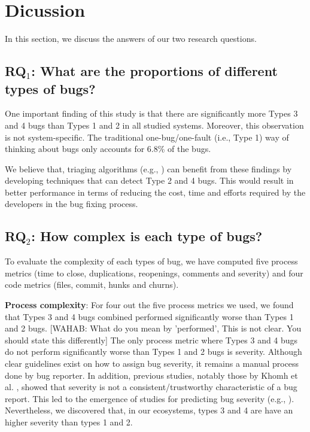 
\section{Dicussion}

In this section, we discuss the answers of our two research questions.

\subsection{RQ$_1$: What are the proportions of different types of
bugs?}


One important finding of this study is that there are significantly more Types 3 and 4 bugs than Types 1 and 2 in all studied systems.
Moreover, this observation is not system-specific.
The traditional one-bug/one-fault (i.e., Type 1) way of thinking about bugs only accounts for 6.8\% of the bugs.

We believe that, triaging algorithms (e.g., \cite{Jalbert2008,Jeong2009,Khomh2011a,Tamrawi2011a}) can benefit from these findings by developing techniques that can detect Type 2 and 4 bugs.
This would result in better performance in terms of reducing the cost, time and efforts required by the developers in the bug fixing process.

\subsection{RQ$_2$: How complex is each type of bugs?}

To evaluate the complexity of each types of bug, we have computed five process metrics (time to close, duplications, reopenings, comments and severity) and four code metrics (files, commit, hunks and churns).

{\bf Process complexity}: For four out the five process metrics we used, we found that Types 3 and 4 bugs combined performed significantly worse than Types 1 and 2 bugs. [WAHAB: What do you mean by 'performed', This is not clear. You should state this differently]
The only process metric where Types 3 and 4 bugs do not perform significantly worse than Types 1 and 2 bugs is  severity.
Although clear guidelines exist on how to assign bug severity, it remains a manual process done by  bug reporter.
In addition, previous studies, notably those by Khomh et al.
\cite{Khomh2011a}, showed that severity is not a consistent/trustworthy characteristic of a bug report. This led to the emergence of studies for predicting bug severity  (e.g., \cite{Lamkanfi2010,Lamkanfi2011,Tian2012}).
Nevertheless, we discovered that, in our ecosystems, types 3 and 4 are  have an higher severity than types 1 and 2.

